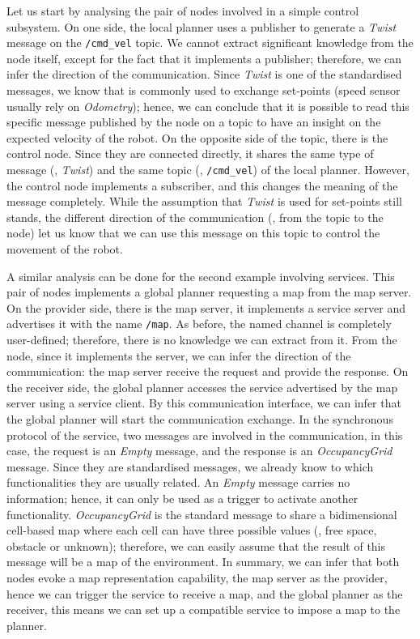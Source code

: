  Let us start by analysing the pair of nodes involved in a simple control subsystem. On one side, the local planner uses a publisher to generate a \textit{Twist} message on the \texttt{/cmd\_vel} topic. We cannot extract significant knowledge from the node itself, except for the fact that it implements a publisher; therefore, we can infer the direction of the communication. Since \textit{Twist} is one of the standardised messages, we know that is commonly used to exchange set-points (speed sensor usually rely on \textit{Odometry}); hence, we can conclude that it is possible to read this specific message published by the node on a topic to have an insight on the expected velocity of the robot. On the opposite side of the topic, there is the control node. Since they are connected directly, it shares the same type of message (\ie, \textit{Twist}) and the same topic (\ie, \texttt{/cmd\_vel}) of the local planner. However, the control node implements a subscriber, and this changes the meaning of the message completely. While the assumption that \textit{Twist} is used for set-points still stands, the different direction of the communication (\ie, from the topic to the node) let us know that we can use this message on this topic to control the movement of the robot.

A similar analysis can be done for the second example involving services. This pair of nodes implements a global planner requesting a map from the map server. On the provider side, there is the map server, it implements a service server and advertises it with the name \texttt{/map}. As before, the named channel is completely user-defined; therefore, there is no knowledge we can extract from it. From the node, since it implements the server, we can infer the direction of the communication: the map server receive the request and provide the response. On the receiver side, the global planner accesses the service advertised by the map server using a service client. By this communication interface, we can infer that the global planner will start the communication exchange. In the synchronous protocol of the service, two messages are involved in the communication, in this case, the request is an \textit{Empty} message, and the response is an \textit{OccupancyGrid} message. Since they are standardised messages, we already know to which functionalities they are usually related. An \textit{Empty} message carries no information; hence, it can only be used as a trigger to activate another functionality. \textit{OccupancyGrid} is the standard message to share a bidimensional cell-based map where each cell can have three possible values (\ie, free space, obstacle or unknown); therefore, we can easily assume that the result of this message will be a map of the environment. In summary, we can infer that both nodes evoke a map representation capability, the map server as the provider, hence we can trigger the service to receive a map, and the global planner as the receiver, this means we can set up a compatible service to impose a map to the planner.

